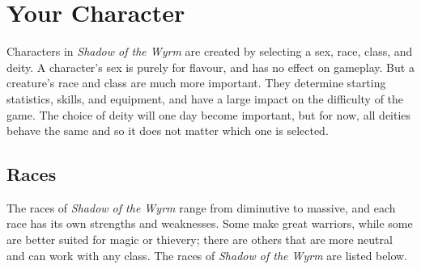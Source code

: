 \section{Your Character}

Characters in {\it Shadow of the Wyrm} are created by selecting a sex, race,
class, and deity.  A character's sex is purely for flavour, and has no 
effect on gameplay.  But a creature's race and class are much more 
important.  They determine starting statistics, skills, and equipment, and 
have a large impact on the difficulty of the game.  The choice of deity
will one day become important, but for now, all deities behave the same and
so it does not matter which one is selected.

\subsection{Races}

The races of {\it Shadow of the Wyrm} range from diminutive to massive, and
each race has its own strengths and weaknesses.  Some make great warriors, 
while some are better suited for magic or thievery; there are others that
are more neutral and can work with any class.  The races of {\it Shadow
of the Wyrm} are listed below.

